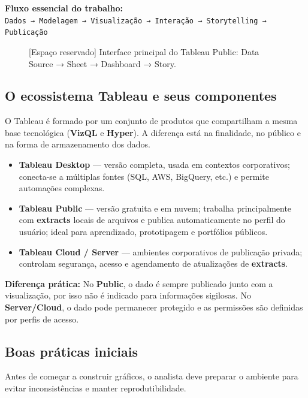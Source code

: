 \begin{FormulaBox}
\textbf{Fluxo essencial do trabalho:}\\[3pt]
\texttt{Dados → Modelagem → Visualização → Interação → Storytelling → Publicação}
\end{FormulaBox}

\begin{figure}[H]
\centering
\fbox{\rule{0pt}{110pt}\rule{0.9\linewidth}{0pt}}
\caption{[Espaço reservado] Interface principal do Tableau Public: Data Source → Sheet → Dashboard → Story.}
\end{figure}

\subsection*{O ecossistema Tableau e seus componentes}
O Tableau é formado por um conjunto de produtos que compartilham a mesma base tecnológica (\textbf{VizQL} e \textbf{Hyper}).  
A diferença está na finalidade, no público e na forma de armazenamento dos dados.

\begin{itemize}[leftmargin=*]
  \item \textbf{Tableau Desktop} — versão completa, usada em contextos corporativos; conecta-se a múltiplas fontes (SQL, AWS, BigQuery, etc.) e permite automações complexas.
  
  \item \textbf{Tableau Public} — versão gratuita e em nuvem; trabalha principalmente com \textbf{extracts} locais de arquivos e publica automaticamente no perfil do usuário; ideal para aprendizado, prototipagem e portfólios públicos.
  
  \item \textbf{Tableau Cloud / Server} — ambientes corporativos de publicação privada; controlam segurança, acesso e agendamento de atualizações de \textbf{extracts}.
\end{itemize}

\begin{NoteBox}
\textbf{Diferença prática:}  
No \textbf{Public}, o dado é sempre publicado junto com a visualização, por isso não é indicado para informações sigilosas.  
No \textbf{Server/Cloud}, o dado pode permanecer protegido e as permissões são definidas por perfis de acesso.
\end{NoteBox}

\subsection*{Boas práticas iniciais}
Antes de começar a construir gráficos, o analista deve preparar o ambiente para evitar inconsistências e manter reprodutibilidade.

